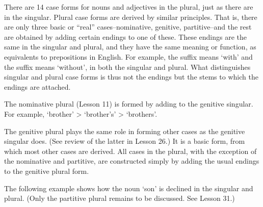 \newLesson %
\label{lesson-30}

\Grammar %


\newSection \label{section-241} There are 14 case forms for nouns and adjectives in the plural, just as there are in the singular. Plural case forms are derived by similar principles. That is, there are only three basic or ``real'' cases--nominative, genitive, partitive--and the rest are obtained by adding certain endings to one of these. These endings are the same in the singular and plural, and they have the same meaning or function, as equivalents to prepositions in English. For example, the suffix  means `with' and the suffix  means `without', in both the singular and plural. What distinguishes singular and plural case forms is thus not the endings but the stems to which the endings are attached.

\newSection \label{section-242} The nominative plural (Lesson 11) is formed by adding  to the genitive singular. For example, \nom \sing {} `brother' > \gen \sing {} `brother's' > \nom \pl {} `brothers'.

\newSection \label{section-243} The genitive plural plays the same role in forming other cases as the genitive singular does. (See review of the latter in Lesson 26.) It is a basic form, from which most other cases are derived. All cases in the plural, with the exception of the nominative and partitive, are constructed simply by adding the usual endings to the genitive plural form.

\newSection \label{section-244} The following example shows how the noun  `son' is declined in the singular and plural. (Only the partitive plural remains to be discussed. See Lesson 31.)

